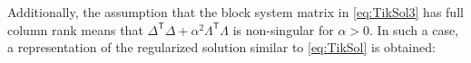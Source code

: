 \documentclass[12pt]{article}
\newcommand{\trans}[1]{{#1}^\mathsf{T}}	%
\newcommand{\regparam}{\alpha}
\newcommand{\zeroVec}{\bm{0}}	%
\newtheorem{corollary}{Corollary}[theorem]
\begin{document}
%
%
Additionally, the assumption that the block system matrix in \eqref{eq:TikSol3} has full column rank means that $\trans{\Delta}\Delta + \regparam^2 \trans{\Lambda}\Lambda$ is non-singular for $\regparam > 0$. In such a case, a representation of the regularized solution similar to \eqref{eq:TikSol} is obtained:
\end{document}
